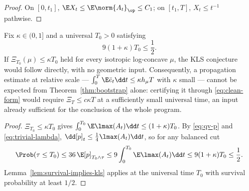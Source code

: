 \documentclass[../../main.tex]{subfiles}
\begin{document}
\begin{proof}
On $[0,t_1]$, $\E X_t\le\E\norm{A_t}_\op\le C_1$; on $[t_1,T]$, $X_t\le t^{-1}$ pathwise.
\end{proof}

\begin{proposition}
\label{prop:ceiling}
Fix $\kappa\in(0,1]$ and a universal $T_0>0$ satisfying
\begin{equation}\label{eq:ceiling-smallness}
  9(1+\kappa)T_0\le\frac12.
\end{equation}
If $\Xi_{T_0}(\mu)\le\kappa T_0$ held for every isotropic log-concave $\mu$, the KLS conjecture
would follow directly, with no geometric input.
Consequently, a propagation estimate at relative scale ---
$\int_0^T\E\bar e_t\dd t\le\kappa h_\mu T$ with $\kappa$ small --- cannot be expected from
Theorem~\ref{thm:bootstrap} alone: certifying it through \eqref{eq:clean-form} would require
$\Xi_T\le c\kappa T$ at a sufficiently small universal time, an input already sufficient for
the conclusion of the whole program.
\end{proposition}

\begin{proof}
$\Xi_{T_0}\le\kappa T_0$ gives $\int_0^{T_0}\E\lmax(A_t)\dd t\le(1+\kappa)T_0$. By
\eqref{eq:qv-p} and \eqref{eq:trivial-lambda}, $\dd[p]_t\le\tfrac14\lmax(A_t)\dd t$, so for any
balanced cut
\[
  \Prob(\tau\le T_0)
  \le36\,\E[p]_{T_0\wedge\tau}
  \le9\int_0^{T_0}\E\lmax(A_t)\dd t
  \le9(1+\kappa)T_0\le\frac12.
\]
Lemma~\ref{lem:survival-implies-kls} applies at the universal time $T_0$ with survival
probability at least $1/2$.
\end{proof}
\end{document}
